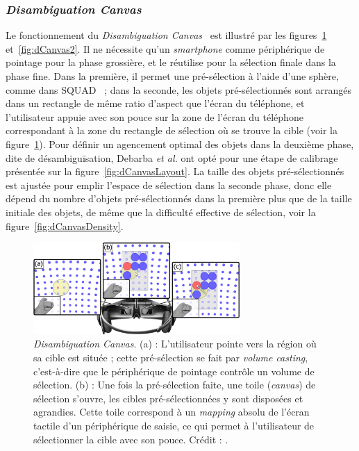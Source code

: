 	\subsubsection{\emph{Disambiguation Canvas}}
	Le fonctionnement du \emph{Disambiguation Canvas}~\cite{debarba2013disambiguation} est illustré par les figures~\ref{fig:dCanvas} et~\ref{fig:dCanvas2}. Il ne nécessite qu'un \emph{smartphone} comme périphérique de pointage pour la phase grossière, et le réutilise pour la sélection finale dans la phase fine. Dans la première, il permet une pré-sélection à l'aide d'une sphère, comme dans SQUAD~\cite{kopper2011rapid} ; dans la seconde, les objets pré-sélectionnés sont arrangés dans un rectangle de même ratio d'aspect que l'écran du téléphone, et l'utilisateur appuie avec son pouce sur la zone de l'écran du téléphone correspondant à la zone du rectangle de sélection où se trouve la cible (voir la figure~\ref{fig:dCanvas}). Pour définir un agencement optimal des objets dans la deuxième phase, dite de désambiguïsation, Debarba \emph{et al.} ont opté pour une étape de calibrage présentée sur la figure~\ref{fig:dCanvasLayout}. La taille des objets pré-sélectionnés est ajustée pour emplir l'espace de sélection dans la seconde phase, donc elle dépend du nombre d'objets pré-sélectionnés dans la première plus que de la taille initiale des objets, de même que la difficulté effective de sélection, voir la figure~\ref{fig:dCanvasDensity}.
		 
	\begin{figure}[!htbp]
		\centering
		\includegraphics[width=0.7\textwidth]{figures/ch2/dCanvas}
		\caption[\emph{Disambiguation Canvas}]{\emph{Disambiguation Canvas}. (a) : L'utilisateur pointe vers la région où sa cible est située ; cette pré-sélection se fait par \emph{volume casting}, c'est-à-dire que le périphérique de pointage contrôle un volume de sélection. (b) : Une fois la pré-sélection faite, une \og toile \fg{} (\emph{canvas}) de sélection s'ouvre, les cibles pré-sélectionnées y sont disposées et agrandies. Cette toile correspond à un \emph{mapping} absolu de l'écran tactile d'un périphérique de saisie, ce qui permet à l'utilisateur de sélectionner la cible avec son pouce. Crédit : \cite{debarba2013disambiguation}.}
		\label{fig:dCanvas}
	\end{figure}
		

